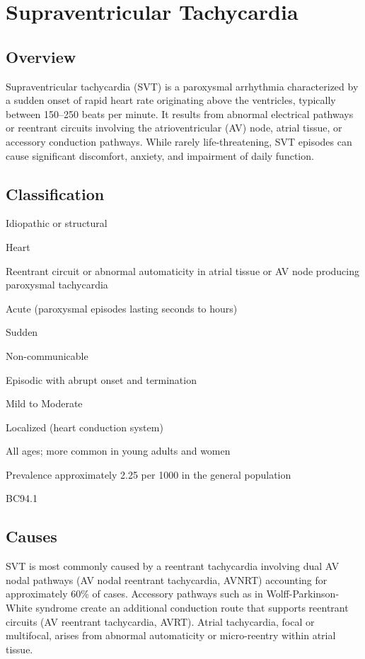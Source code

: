 \chapter{Supraventricular Tachycardia}
\label{sec:Supraventricular Tachycardia}

\section{Overview}
Supraventricular tachycardia (SVT) is a paroxysmal arrhythmia characterized by a sudden onset of rapid heart rate originating above the ventricles, typically between 150--250 beats per minute. It results from abnormal electrical pathways or reentrant circuits involving the atrioventricular (AV) node, atrial tissue, or accessory conduction pathways. While rarely life-threatening, SVT episodes can cause significant discomfort, anxiety, and impairment of daily function.
\section{Classification}

\begin{description}[font=\normalfont\bfseries,leftmargin=3em,labelwidth=2.5em]
  \item[Cause] Idiopathic or structural
  \item[Organ System] Heart
  \item[Pathophysiology] Reentrant circuit or abnormal automaticity in atrial tissue or AV node producing paroxysmal tachycardia
  \item[Duration] Acute (paroxysmal episodes lasting seconds to hours)
  \item[Onset] Sudden
  \item[Mode of Transmission] Non-communicable
  \item[Clinical Course] Episodic with abrupt onset and termination
  \item[Severity] Mild to Moderate
  \item[Extent of Disease] Localized (heart conduction system)
  \item[Age Group] All ages; more common in young adults and women
  \item[Epidemiology] Prevalence approximately 2.25 per 1000 in the general population
  \item[ICD-11 Code] BC94.1
\end{description}

\section{Causes}
SVT is most commonly caused by a reentrant tachycardia involving dual AV nodal pathways (AV nodal reentrant tachycardia, AVNRT) accounting for approximately 60\% of cases. Accessory pathways such as in Wolff-Parkinson-White syndrome create an additional conduction route that supports reentrant circuits (AV reentrant tachycardia, AVRT). Atrial tachycardia, focal or multifocal, arises from abnormal automaticity or micro-reentry within atrial tissue.

